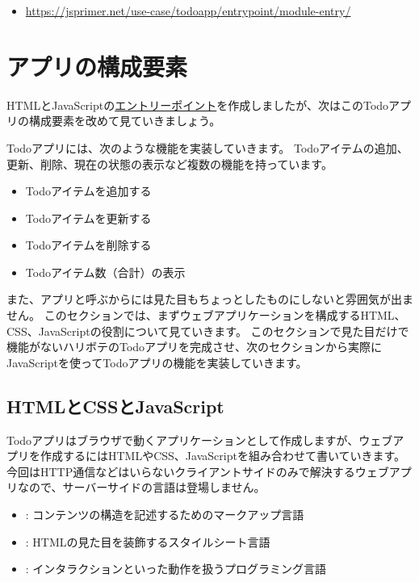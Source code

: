\begin{itemize}
\item
  \url{https://jsprimer.net/use-case/todoapp/entrypoint/module-entry/}
\end{itemize}

\hypertarget{app-structure}{%
\section{アプリの構成要素}\label{app-structure}}

HTMLとJavaScriptの\hyperlink{entrypoint_todo}{エントリーポイント}を作成しましたが、次はこのTodoアプリの構成要素を改めて見ていきましょう。

Todoアプリには、次のような機能を実装していきます。
Todoアイテムの追加、更新、削除、現在の状態の表示など複数の機能を持っています。

\begin{itemize}
\item
  Todoアイテムを追加する
\item
  Todoアイテムを更新する
\item
  Todoアイテムを削除する
\item
  Todoアイテム数（合計）の表示
\end{itemize}

また、アプリと呼ぶからには見た目もちょっとしたものにしないと雰囲気が出ません。
このセクションでは、まずウェブアプリケーションを構成するHTML、CSS、JavaScriptの役割について見ていきます。
このセクションで見た目だけで機能がないハリボテのTodoアプリを完成させ、次のセクションから実際にJavaScriptを使ってTodoアプリの機能を実装していきます。

\hypertarget{html-css-javascript}{%
\subsection{HTMLとCSSとJavaScript}\label{html-css-javascript}}

Todoアプリはブラウザで動くアプリケーションとして作成しますが、ウェブアプリを作成するにはHTMLやCSS、JavaScriptを組み合わせて書いていきます。
今回はHTTP通信などはいらないクライアントサイドのみで解決するウェブアプリなので、サーバーサイドの言語は登場しません。

\begin{itemize}
\item
  : コンテンツの構造を記述するためのマークアップ言語
\item
  : HTMLの見た目を装飾するスタイルシート言語
\item
  : インタラクションといった動作を扱うプログラミング言語
\end{itemize}

